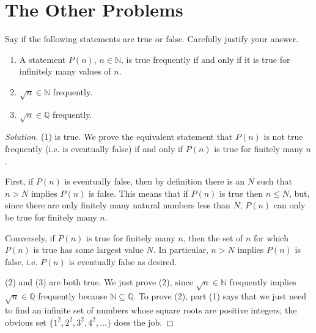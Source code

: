 \documentclass[11pt]{scrartcl}
\providecommand{\NN}{\mathbb N}
\providecommand{\QQ}{\mathbb Q}
\providecommand{\ii}{\item}
\theoremstyle{remark}
\newenvironment{problem}[1]
{\renewcommand\theinnercustomthm{\textit{#1}}\innercustomthm}
{\endinnercustomthm}
\newenvironment{soln}{\begin{proof}[Solution]}{\end{proof}}
\begin{document}
	\section{The Other Problems}
	\begin{problem}{1}
		Say if the following statements are true or false.
		Carefully justify your answer.
		\begin{enumerate}[(1)]
			\ii A statement $P(n)$, $n\in\NN$, is true frequently if and only if
			it is true for infinitely many values of $n$.
			\ii $\sqrt n\in\NN$ frequently.
			\ii $\sqrt n\in\QQ$ frequently.
		\end{enumerate}
	\end{problem}
	\begin{soln}
		(1) is true. We prove the equivalent statement that
		$P(n)$ is not true frequently (i.e. is eventually false)
		if and only if $P(n)$ is true for finitely many $n$.
		
		First, if $P(n)$ is eventually false, then by definition there is an $N$
		such that $n > N$ implies $P(n)$ is false. This means that if $P(n)$ is true
		then $n \le N$, but, since there are only finitely many natural numbers
		less than $N$, $P(n)$ can only be true for finitely many $n$.
		
		Conversely, if $P(n)$ is true for finitely many $n$,
		then the set of $n$ for which $P(n)$ is true has some largest value $N$.
		In particular, $n > N$ implies $P(n)$ is false, i.e. $P(n)$
		is eventually false as desired.
		
		(2) and (3) are both true. We just prove (2), since
		$\sqrt n\in \NN$ frequently implies $\sqrt n\in\QQ$ frequently
		because $\NN\subseteq \QQ$. To prove (2), part (1) says that
		we just need to find an infinite set of numbers
		whose square roots are positive integers;
		the obvious set $\{1^2, 2^2, 3^2, 4^2, \dots\}$ does the job.
	\end{soln}
	
\end{document}
